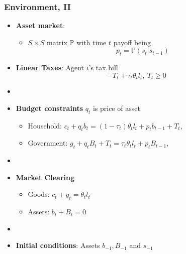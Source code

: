 \documentclass{beamer}
\begin{document}
\begin{frame}
 \frametitle{Environment, II}
 \begin{itemize}
\item \textbf{Asset market}:
\begin{itemize}
\item $S \times S$ matrix $\mathbb{P}$ with time $t$ payoff being
\[p_t=\mathbb{P}(s_{t}|s_{t-1})\]
\end{itemize}



  \item \textbf{Linear Taxes}: Agent $i$'s tax bill
\[- T_t + \tau_t \theta_{t}l_{t},  \ T_t \geq 0 \]

\item[]
  \item \textbf{Budget constraints} $q_t$ is price of  asset

  \begin{itemize}
   \item Household: $ c_{t}+q_tb_{t}=\left( 1-\tau _{t}\right) \theta _{t}l_{t}+p_{t}b_{t-1}+T_{t},$ %
  \item Government: $g_{t}+q_tB_{t}+T_t=\tau _{t}\theta_{t}l_{t}+p_{t}B_{t-1}, $%
  \end{itemize}

\item[]
  \item \textbf{Market Clearing}
  \begin{itemize}
   \item Goods: $c_{t}+g_t = \theta _{t} l_{t}$

   \item Assets: $b_{t}+B_{t}=0$
\end{itemize}
  \item[]

\item \textbf{Initial conditions}: Assets $b_{-1}, B_{-1}$ and  $s_{-1}$
\end{itemize}

\end{frame}
\end{document}
